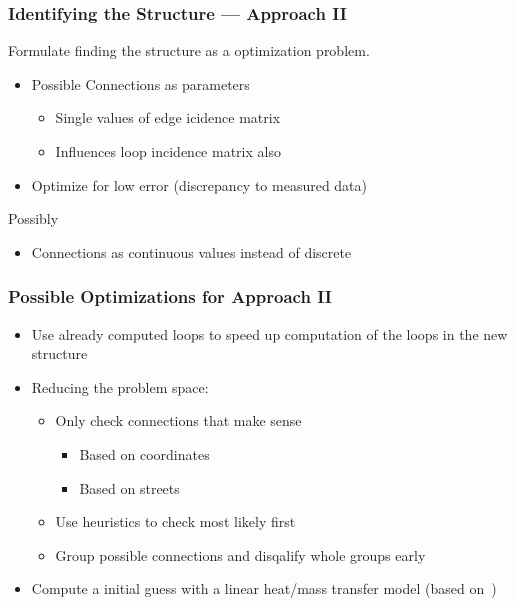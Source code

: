 \documentclass{beamer}
\begin{document}
\begin{frame}
\frametitle{Identifying the Structure --- Approach II}
  Formulate finding the structure as a optimization problem.

  \vspace{2em}

  \begin{itemize}
    \item Possible Connections as parameters
      \begin{itemize}
        \item Single values of edge icidence matrix
        \item Influences loop incidence matrix also
      \end{itemize}
    \item Optimize for low error (discrepancy to measured data)
  \end{itemize}

  \vspace{2em}

  Possibly
  \begin{itemize}
    \item Connections as continuous values instead of discrete
  \end{itemize}
\end{frame}

\begin{frame}
\frametitle{Possible Optimizations for Approach II}
  \begin{itemize}
    \item Use already computed loops to speed up computation of the loops in the new structure
    \item Reducing the problem space:
    \begin{itemize}
      \item Only check connections that make sense
        \begin{itemize}
          \item Based on coordinates
          \item Based on streets
        \end{itemize}
      \item Use heuristics to check most likely first
      \item Group possible connections and disqalify whole groups early
    \end{itemize}
    \item Compute a initial guess with a linear heat/mass transfer model (based on~\cite{wang2024identification})
  \end{itemize}
\end{frame}
\end{document}

